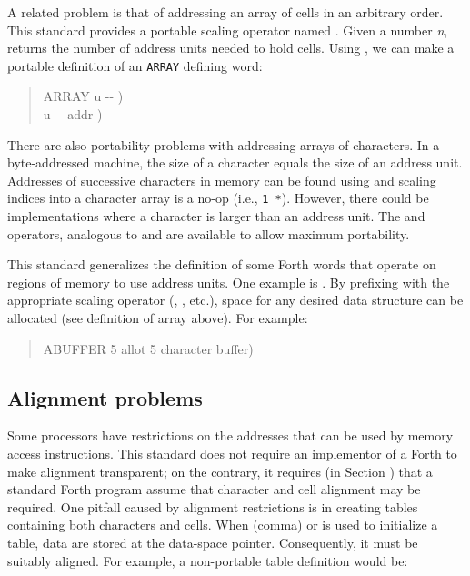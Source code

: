 A related problem is that of addressing an array of cells in an
arbitrary order. This standard provides a portable scaling operator named .
Given a number \emph{n},  returns the number of address
units needed to hold  cells.   Using , we can make
a portable definition of an \texttt{ARRAY} defining word:

\begin{quote}\ttfamily
	\word{:} ARRAY  u -{}- )  ~   \\
	\hspace*{2em}  u -{}- addr )   \word{+} \word{;}
\end{quote}

There are also portability problems with addressing arrays of
characters. 
In a byte-addressed machine, the size of a character equals the
size of an address unit.  Addresses of successive characters
in memory can be found using  and scaling indices into a character
array is a no-op (i.e., \texttt{1 *}).  However, there could be
implementations where a character is larger than an address unit.
The  and  operators, analogous to
 and  are available to allow maximum portability.

This standard generalizes the definition of some Forth words that operate
on regions of memory to use address units. One example is
.  By prefixing  with the appropriate scaling operator
(, , etc.), space for any desired data structure can
be allocated (see definition of array above). For example:

\begin{quote}\ttfamily
	 ABUFFER 5  
	 \textrm{allot 5 character buffer})
\end{quote}


\subsection{Alignment problems} %

Some processors have restrictions on the addresses that can be used by
memory access instructions. This standard does not require an
implementor of a Forth to make alignment transparent; on the
contrary, it requires (in Section ) that
a standard Forth program assume that character and cell alignment may be
required.
One pitfall caused by alignment restrictions
is in creating tables containing both characters and cells. When
\word{,} (comma) or  is used to initialize a table, data
are stored at the data-space pointer. Consequently, it must be
suitably aligned. For example, a non-portable table definition
would be:

